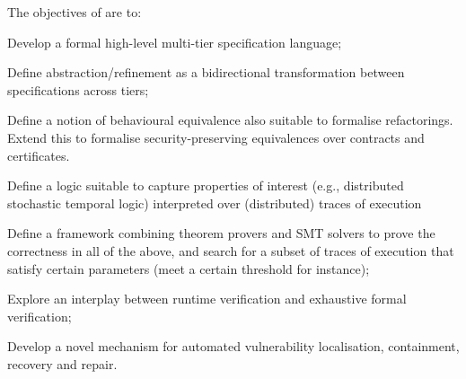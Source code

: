 \addtocounter{wpno}{1}
\begin{Workpackage}{\thewpno}
\WPTitle{\wpname{\thewpno}}


\begin{WPObjectives}
The objectives of \theWP{} are to:
\begin{compactitem}
\item Develop a formal high-level multi-tier specification language; %
\item Define abstraction/refinement as a bidirectional transformation between specifications across tiers;
\item Define a notion of behavioural equivalence also suitable to formalise refactorings. Extend this to formalise security-preserving equivalences over contracts and certificates.
\item Define a logic suitable to capture 
properties of interest (e.g., distributed stochastic temporal logic) interpreted over (distributed) traces of execution 
\item Define a framework combining theorem provers and SMT solvers to prove the correctness in all of the above, and search for a subset of traces of execution that satisfy certain parameters (meet a certain threshold for instance);
\item Explore an interplay between runtime verification and exhaustive formal verification;
\item Develop a novel mechanism for automated 
vulnerability localisation, containment, recovery and repair.

\end{compactitem}







\end{WPObjectives}
\end{Workpackage}

